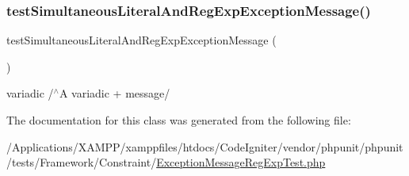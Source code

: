 \subsubsection{\texorpdfstring{test\+Simultaneous\+Literal\+And\+Reg\+Exp\+Exception\+Message()}{testSimultaneousLiteralAndRegExpExceptionMessage()}}
{\footnotesize\ttfamily test\+Simultaneous\+Literal\+And\+Reg\+Exp\+Exception\+Message (\begin{DoxyParamCaption}{ }\end{DoxyParamCaption})}

variadic  /$^\wedge$A variadic + message/ 

The documentation for this class was generated from the following file\+:\begin{DoxyCompactItemize}
\item 
/\+Applications/\+X\+A\+M\+P\+P/xamppfiles/htdocs/\+Code\+Igniter/vendor/phpunit/phpunit/tests/\+Framework/\+Constraint/\mbox{\hyperlink{_exception_message_reg_exp_test_8php}{Exception\+Message\+Reg\+Exp\+Test.\+php}}\end{DoxyCompactItemize}
